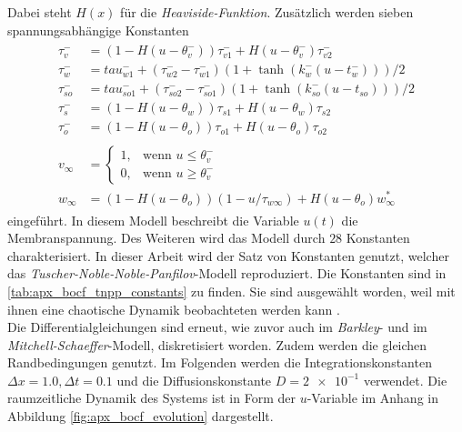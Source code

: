 Dabei steht $H(x)$ für die \textit{Heaviside-Funktion}. Zusätzlich werden sieben spannungsabhängige Konstanten
\begin{align}
\begin{aligned}
\tau_v^-   &= (1-H(u-\theta_v^-))\tau_{v1}^- + H(u-\theta_v^-)\tau_{v2}^- \\
\tau_w^-   &= tau_{w1}^- + (\tau_{w2}^- - \tau_{w1}^-)(1+\tanh(k_w^-(u-t_w^-)))/2 \\
\tau_{so}^- &= tau_{so1}^- + (\tau_{so2}^- - \tau_{so1}^-)(1+\tanh(k_{so}^-(u-t_{so})))/2 \\
\tau_s^-    &= (1-H(u-\theta_w))\tau_{s1} + H(u-\theta_w)\tau_{s2} \\ 
\tau_o^-    &= (1-H(u-\theta_o))\tau_{o1} + H(u-\theta_o)\tau_{o2} \\\\
v_\infty &= \begin{cases}
	1,& \text{wenn } u \leq \theta_v^-\\
    0,& \text{wenn } u \geq \theta_v^-
\end{cases} \\
w_\infty &= (1-H(u-\theta_o))(1-u/\tau_{w\infty}) + H(u-\theta_o)w_\infty^*
\end{aligned}
\end{align}
eingeführt. In diesem Modell beschreibt die Variable $u(t)$ die Membranspannung. Des Weiteren wird das Modell durch $28$ Konstanten charakterisiert. In dieser Arbeit wird der Satz von Konstanten genutzt, welcher das \textit{Tuscher-Noble-Noble-Panfilov}-Modell reproduziert. Die Konstanten sind in \ref{tab:apx_bocf_tnpp_constants} zu finden. Sie sind ausgewählt worden, weil mit ihnen eine chaotische Dynamik beobachteten werden kann \citep{Bueno-Orovio2008}.\\

Die Differentialgleichungen sind erneut, wie zuvor auch im \textit{Barkley}- und im \textit{Mitchell-Schaeffer}-Modell, diskretisiert worden. Zudem werden die gleichen Randbedingungen genutzt. Im Folgenden werden die Integrationskonstanten $\Delta x = 1.0, \Delta t = 0.1$ und die Diffusionskonstante $D = \num{2e-1}$ verwendet. Die raumzeitliche Dynamik des Systems ist in Form der $u$-Variable im Anhang in Abbildung \ref{fig:apx_bocf_evolution} dargestellt.\\
